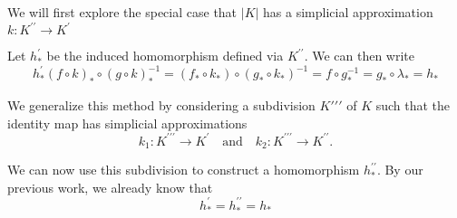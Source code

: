 \documentclass[toc=bib]{scrartcl}
\theoremstyle{plain}
\theoremstyle{definition}
\theoremstyle{remark}
\newcommand{\pprime}{{\prime\prime}}
\newcommand{\ppprime}{{\pprime\prime}}
\newcommand{\qandq}{\quad \text{and} \quad}
\begin{document}
We will first explore the special case that $|K|$ has a simplicial approximation $k: K^\pprime\to K^\prime$

\begin{center}
	
\end{center}

Let $h_\ast^\prime$ be the induced homomorphism defined via $K^\pprime$. We can then write
\[
h_\ast^\prime(f\circ k)_\ast\circ(g\circ k)_\ast^{-1}=(f_\ast\circ k_\ast)\circ(g_\ast\circ k_\ast)^{-1}=f\circ g_\ast^{-1}=g_\ast\circ\lambda_\ast=h_\ast
\]

We generalize this method by considering a subdivision $K\ppprime$ of $K$ such that the identity map has simplicial approximations
\[
k_1: K^\ppprime\to K^\prime\qandq k_2: K^\ppprime\to K^\pprime.
\]

We can now use this subdivision to construct a homomorphism $h_\ast^\pprime$. By our previous work, we already know that 
\[
h_\ast^\prime=h_\ast^\pprime=h_\ast
\]
\end{document}
